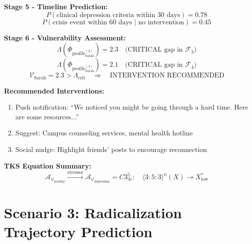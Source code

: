 \documentclass[11pt,twoside]{book}
\newcommand{\Foundations}{\mathcal{F}}
\newcommand{\Lacunarity}{\Lambda}
\newcommand{\PsychAttractor}{\mathcal{A}_\psi}
\newcommand{\ProfileFrac}{\Phi_{\mathrm{profile}}}
\newcommand{\VulnScore}{\mathcal{V}}
\begin{document}
\begin{tcolorbox}[colback=yellow!5!white,colframe=yellow!65!black,title=\textbf{Scenario: Early Detection of Sarah's Crisis},breakable]
\textbf{Stage 5 - Timeline Prediction:}
\[
    P(\text{clinical depression criteria within 30 days}) = 0.78
\]
\[
    P(\text{crisis event within 60 days | no intervention}) = 0.45
\]

\textbf{Stage 6 - Vulnerability Assessment:}
\[
    \Lacunarity(\ProfileFrac_{\text{Sarah}}^{(3)}) = 2.3 \quad \text{(CRITICAL gap in } \Foundations_3 \text{)}
\]
\[
    \Lacunarity(\ProfileFrac_{\text{Sarah}}^{(4)}) = 2.1 \quad \text{(CRITICAL gap in } \Foundations_4 \text{)}
\]
\[
    \VulnScore_{\text{Sarah}} = 2.3 > \Lacunarity_{\text{crit}} \quad \Rightarrow \quad \text{INTERVENTION RECOMMENDED}
\]

\textbf{Recommended Interventions:}
\begin{enumerate}
    \item Push notification: ``We noticed you might be going through a hard time. Here are some resources...''
    \item Suggest: Campus counseling services, mental health hotline
    \item Social nudge: Highlight friends' posts to encourage reconnection
\end{enumerate}

\textbf{TKS Equation Summary:}
\begin{equation}
\boxed{
    \PsychAttractor_{\text{healthy}} \xrightarrow{\text{stressor}}
    \PsychAttractor_{\text{depression}} = C3^5_{3c} : \quad
    \langle 3:5:3 \rangle^n(X) \to X^*_{\text{low}}
}
\end{equation}

\end{tcolorbox}

\chapter{Scenario 3: Radicalization Trajectory Prediction}
\label{ch:scenario-radicalization}
\end{document}
